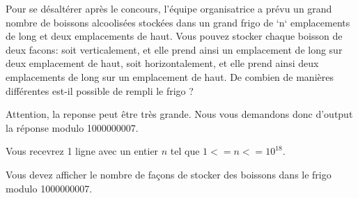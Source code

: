\problemname{\problemyamlname}


Pour se désaltérer après le concours, l'équipe organisatrice a prévu un grand
nombre de boissons alcoolisées stockées dans un grand frigo de `n` emplacements
de long et deux emplacements de haut.  Vous pouvez stocker chaque boisson de
deux facons: soit verticalement, et elle prend ainsi un emplacement de long sur
deux emplacement de haut, soit horizontalement, et elle prend ainsi deux
emplacements de long sur un emplacement de haut. De combien de manières
différentes est-il possible de rempli le frigo ? 

Attention, la reponse peut être très grande. Nous vous demandons donc d'output
la réponse modulo 1000000007.


\begin{Input}
    Vous recevrez 1 ligne avec un entier $n$ tel que $1 <= n <= 10^18$.
\end{Input}

\begin{Output}
    Vous devez afficher le nombre de façons de stocker des boissons dans le frigo
modulo 1000000007.

\end{Output}
